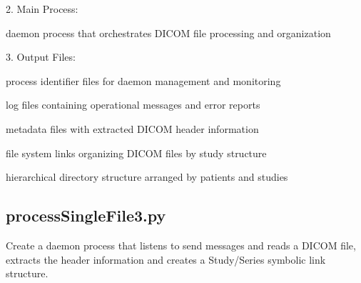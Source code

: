 \documentclass[letterpaper,10pt,english]{sphinxmanual}
\begin{document}
\begin{DUlineblock}{0em}
\item[] 2. Main Process:
\end{DUlineblock}

\begin{DUlineblock}{0em}
\item[] \sphinxhyphen{}  \sphinxhyphen{} daemon process that orchestrates DICOM file processing and organization
\end{DUlineblock}

\begin{DUlineblock}{0em}
\item[] 3. Output Files:
\end{DUlineblock}

\begin{DUlineblock}{0em}
\item[] \sphinxhyphen{}  \sphinxhyphen{} process identifier files for daemon management and monitoring
\item[] \sphinxhyphen{}  \sphinxhyphen{} log files containing operational messages and error reports
\item[] \sphinxhyphen{}  \sphinxhyphen{} metadata files with extracted DICOM header information
\item[] \sphinxhyphen{}  \sphinxhyphen{} file system links organizing DICOM files by study structure
\item[] \sphinxhyphen{}  \sphinxhyphen{} hierarchical directory structure arranged by patients and studies
\end{DUlineblock}


\subsection{processSingleFile3.py}
\label{\detokenize{Architecture/scripts/processSingleFile3:processsinglefile3-py}}\label{\detokenize{Architecture/scripts/processSingleFile3::doc}}
\sphinxAtStartPar
Create a daemon process that listens to send messages and reads a DICOM file,
extracts the header information and creates a Study/Series symbolic link structure.
\begin{description}
\sphinxAtStartPar
{}

\end{description}
\end{document}
